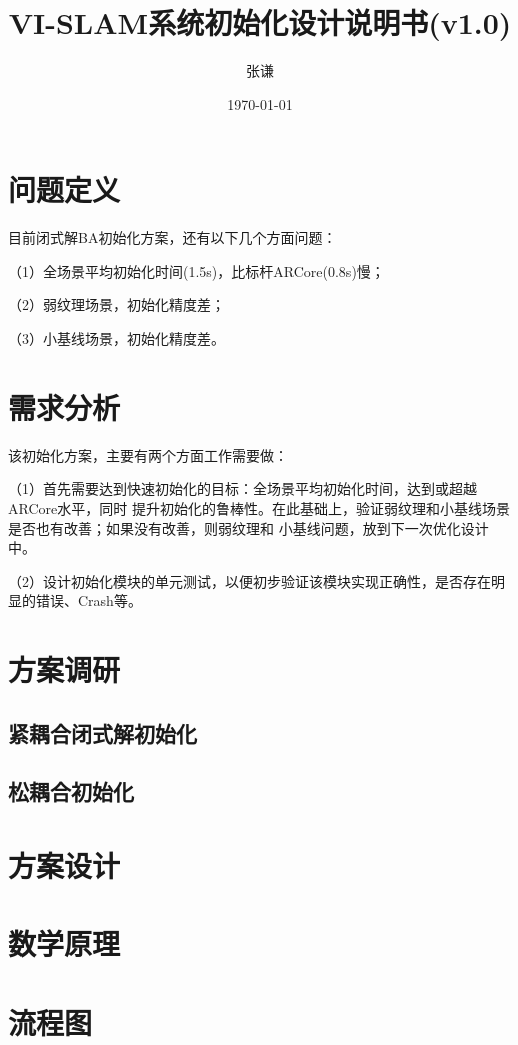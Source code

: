\documentclass{article}
\title{VI-SLAM系统初始化设计说明书(v1.0)}
\author{张谦}
\date{\today}
\begin{document}
\maketitle
\tableofcontents
\newpage

\section{问题定义}
目前闭式解BA初始化方案，还有以下几个方面问题：
\par
（1）全场景平均初始化时间(1.5s)，比标杆ARCore(0.8s)慢；
\par
（2）弱纹理场景，初始化精度差；
\par
（3）小基线场景，初始化精度差。

\section{需求分析}
该初始化方案，主要有两个方面工作需要做：
\par
（1）首先需要达到快速初始化的目标：全场景平均初始化时间，达到或超越ARCore水平，同时
提升初始化的鲁棒性。在此基础上，验证弱纹理和小基线场景是否也有改善；如果没有改善，则弱纹理和
小基线问题，放到下一次优化设计中。
\par
（2）设计初始化模块的单元测试，以便初步验证该模块实现正确性，是否存在明显的错误、Crash等。

\section{方案调研}
\subsection{紧耦合闭式解初始化}

\subsection{松耦合初始化}


\section{方案设计}

\section{数学原理}

\section{流程图}
\end{document}
